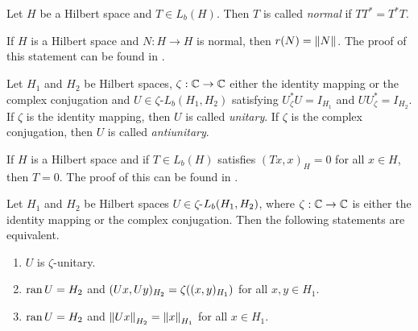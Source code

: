 \begin{definition}
	Let $H$ be a Hilbert space and $T\in L_b(H)$. Then $T$ is called \textit{normal} if $TT^\ast = T^\ast T$. 
\end{definition}


\begin{remark} \label{remark:spectral_radius}
	If $H$ is a Hilbert space and $N: H \to H$ is normal, then $r(N) = \norm{N}$. The proof of this statement can be found in \cite[p.142]{FAna1}.
\end{remark}


\begin{definition}
	Let $H_1$ and $H_2$ be Hilbert spaces, $\zeta: \C \to \C$ either the identity mapping or the complex conjugation and $U \in \zeta$-$L_b(H_1, H_2)$ satisfying $U_\zeta^\ast U = I_{H_1}$ and $UU_\zeta^\ast = I_{H_2}$. If $\zeta$ is the identity mapping, then $U$ is called \textit{unitary}. If $\zeta$ is the complex conjugation, then $U$ is called \textit{antiunitary}.
\end{definition}


\begin{remark}\label{remark:operator_equivalence_hilbert}
		If $H$ is a Hilbert space and if $T\in L_b(H)$ satisfies $(Tx,x)_H = 0$ for all $x \in H$, then $T = 0$. The proof of this can be found in \cite[p.142]{FAna1}.
\end{remark}


\begin{proposition} \label{prop:unitary}
	Let $H_1$ and $H_2$ be Hilbert spaces $U \in \zeta$-$L_b\pbraces{H_1, H_2}$, where $\zeta: \C \to \C$ is either the identity mapping or the complex conjugation. Then the following statements are equivalent.
	\begin{enumerate}[label = (\roman*)]
		\item $U$ is $\zeta$-unitary. 
		\item $\ran U = H_2$ and $(Ux , Uy)_{H_2} = \zeta\pbraces{(x,y)_{H_1}}$ for all $x,y \in H_1$.
		\item $\ran U = H_2$ and $\norm[H_2]{Ux} = \norm[H_1]{x}$ for all $x \in H_1$. 
	\end{enumerate}
\end{proposition}

